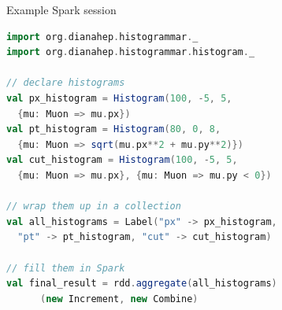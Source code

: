\documentclass{beamer}
\begin{document}
\begin{frame}[fragile]{Example Spark session}
\begin{lstlisting}[language=scala]
import org.dianahep.histogrammar._
import org.dianahep.histogrammar.histogram._

// declare histograms
val px_histogram = Histogram(100, -5, 5,
  {mu: Muon => mu.px})
val pt_histogram = Histogram(80, 0, 8,
  {mu: Muon => sqrt(mu.px**2 + mu.py**2)})
val cut_histogram = Histogram(100, -5, 5,
  {mu: Muon => mu.px}, {mu: Muon => mu.py < 0})

// wrap them up in a collection
val all_histograms = Label("px" -> px_histogram,
  "pt" -> pt_histogram, "cut" -> cut_histogram)

// fill them in Spark
val final_result = rdd.aggregate(all_histograms)
      (new Increment, new Combine)
\end{lstlisting}
\end{frame}
\end{document}
